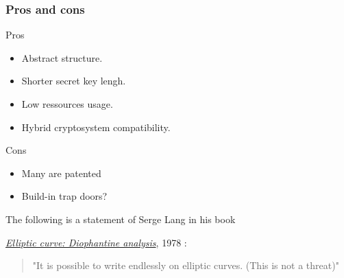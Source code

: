 \begin{frame}[t]
    \frametitle{Pros and cons}
    Pros
    \begin{itemize}
        \item Abstract structure.
        \item Shorter secret key lengh.
        \item Low ressources usage.
        \item Hybrid cryptosystem compatibility.
    \end{itemize}

    Cons
    \begin{itemize}
        \item Many are patented
        \item Build-in trap doors? \cite{noauthor_how_2014} \cite{goodin_we_2013}
    \end{itemize}

    \begin{center}
    The following is a statement of Serge Lang in his book

    \textit{\underline{Elliptic curve:
    Diophantine analysis}}, 1978 \cite{lang_auth_elliptic_1978}: 
    \begin{quote}
       "It is possible to write endlessly on elliptic curves. (This is not a threat)"
    \end{quote}
    \end{center}
\end{frame}

